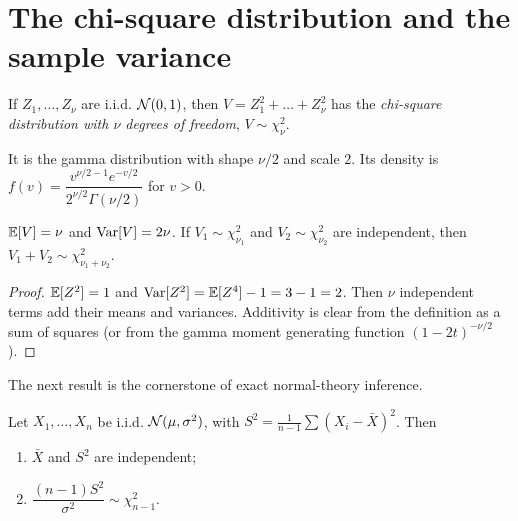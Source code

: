 \section{The chi-square distribution and the sample variance}

\begin{definition}
If $Z_1,\dots,Z_\nu$ are i.i.d. $\mathcal{N}(0,1)$, then $V=Z_1^2+\dots+Z_\nu^2$ has the \emph{chi-square distribution with $\nu$ degrees of freedom}, $V\sim\chi^2_\nu$.

It is the gamma distribution with shape $\nu/2$ and scale $2$. Its density is $f(v)=\dfrac{v^{\nu/2-1}e^{-v/2}}{2^{\nu/2}\Gamma(\nu/2)}$ for $v>0$.
\end{definition}

\begin{proposition}\label{prop:chisq}
$\mathbb{E}[V]=\nu$ and $\operatorname{Var}[V]=2\nu$. If $V_1\sim\chi^2_{\nu_1}$ and $V_2\sim\chi^2_{\nu_2}$ are independent, then $V_1+V_2\sim\chi^2_{\nu_1+\nu_2}$.
\end{proposition}

\begin{proof}
$\mathbb{E}[Z^2]=1$ and $\operatorname{Var}[Z^2]=\mathbb{E}[Z^4]-1=3-1=2$. Then $\nu$ independent terms add their means and variances. Additivity is clear from the definition as a sum of squares (or from the gamma moment generating function $(1-2t)^{-\nu/2}$).
\end{proof}

The next result is the cornerstone of exact normal-theory inference.

\begin{theorem}\label{thm:cochran}
Let $X_1,\dots,X_n$ be i.i.d. $\mathcal{N}(\mu,\sigma^2)$, with $S^2=\frac1{n-1}\sum(X_i-\bar{X})^2$. Then
\begin{enumerate}[label=(\roman*)]
  \item $\bar{X}$ and $S^2$ are independent;
  \item $\dfrac{(n-1)S^2}{\sigma^2}\sim\chi^2_{n-1}$.
\end{enumerate}
\end{theorem}

